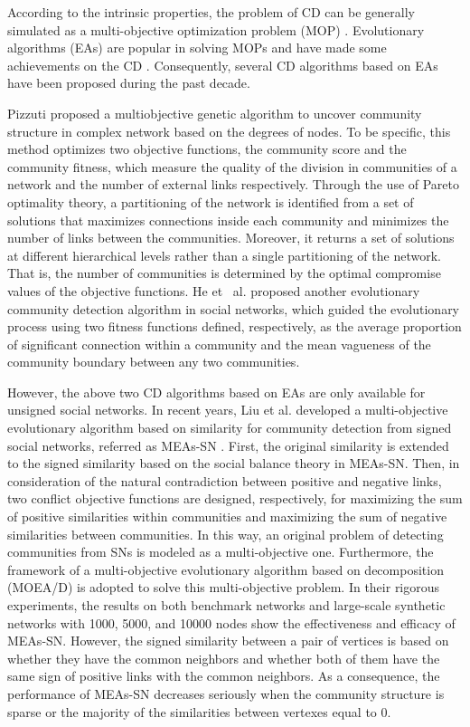 \documentclass[10pt, journal]{IEEEtran}
\begin{document}
According to the intrinsic properties, the problem of CD can be generally simulated as a multi-objective optimization problem (MOP) \cite{zhou2011multiobjective}.  Evolutionary algorithms (EAs) are popular in solving MOPs and have made some achievements on the CD \cite{li2016multi,zhang2017mixed,amelio2016evolutionary,li2015overlapping,wen2017maximal,gong2014complex,gong2012community,liu2006multiagent,liu2008moving,liu2014multiobjective}. Consequently, several CD algorithms based on EAs have been proposed during the past decade.

Pizzuti \cite{pizzuti2009multi} proposed a multiobjective genetic algorithm to uncover community structure in complex network based on the degrees of nodes. To be specific, this method optimizes two objective functions, the community score and the community fitness, which measure the quality of the division in communities of a network and the number of external links respectively. Through the use of Pareto optimality theory, a partitioning of the network is identified from a set of solutions that maximizes connections inside each community and minimizes the number of links between the communities. Moreover, it returns a set of solutions at different hierarchical levels rather than a single partitioning of the network. That is, the number of communities is determined by the optimal compromise values of the objective functions. He et \ al. \cite{He2014Evolutionary} proposed another evolutionary community detection algorithm in social networks, which guided the evolutionary process using two fitness functions defined, respectively, as the average proportion of significant connection within a community and the mean vagueness of the community boundary  between any two communities.


However, the above two CD algorithms based on EAs are only available for unsigned social networks. In recent years, Liu et al. developed
a multi-objective evolutionary algorithm based on similarity for community detection from signed social networks, referred as MEAs-SN \cite{liu2014multiobjective}. First, the original similarity is extended to the signed similarity based on the social balance theory in MEAs-SN. Then, in consideration of the natural contradiction between positive and negative links, two conflict objective functions are designed, respectively, for maximizing the sum of positive similarities within communities and maximizing the sum of negative similarities between communities. In this way, an original problem of detecting communities from SNs is modeled as a multi-objective one. Furthermore, the framework of a multi-objective evolutionary algorithm based on decomposition (MOEA/D) \cite{zhang2007moea} is adopted to solve this multi-objective problem. In their rigorous experiments, the results on both benchmark networks and large-scale synthetic networks with 1000, 5000, and 10000 nodes show the effectiveness and efficacy of MEAs-SN. However, the signed similarity between a pair of vertices is based on whether they have the common neighbors and whether both of them have the same sign of positive links with the common neighbors. As a consequence, the performance of MEAs-SN decreases seriously when the community structure is sparse or the majority of the similarities between vertexes equal to 0.
\end{document}
